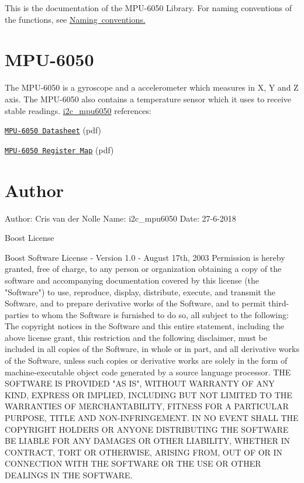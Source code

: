 This is the documentation of the M\+P\+U-\/6050 Library. For naming conventions of the functions, see \mbox{\hyperlink{_page1}{Naming conventions.}} \hypertarget{index_MPU-6050}{}\section{M\+P\+U-\/6050}\label{index_MPU-6050}
The M\+P\+U-\/6050 is a gyroscope and a accelerometer which measures in X, Y and Z axis. The M\+P\+U-\/6050 also contains a temperature sensor which it uses to receive stable readings. \mbox{\hyperlink{classi2c__mpu6050}{i2c\+\_\+mpu6050}}  references\+:
\begin{DoxyItemize}
\item \href{https://www.invensense.com/wp-content/uploads/2015/02/MPU-6000-Datasheet1.pdf}{\tt M\+P\+U-\/6050 Datasheet} (pdf)
\item \href{https://www.invensense.com/wp-content/uploads/2015/02/MPU-6000-Register-Map1.pdf}{\tt M\+P\+U-\/6050 Register Map} (pdf) 
\end{DoxyItemize}\hypertarget{index_Boost}{}\section{Author}\label{index_Boost}
\begin{DoxyVerb}Author: Cris van der Nolle
Name: i2c_mpu6050
Date: 27-6-2018
\end{DoxyVerb}
  Boost License \begin{DoxyVerb}Boost Software License - Version 1.0 - August 17th, 2003
Permission is hereby granted, free of charge, to any person or organization
obtaining a copy of the software and accompanying documentation covered by
this license (the "Software") to use, reproduce, display, distribute,
execute, and transmit the Software, and to prepare derivative works of the
Software, and to permit third-parties to whom the Software is furnished to
do so, all subject to the following:
The copyright notices in the Software and this entire statement, including
the above license grant, this restriction and the following disclaimer,
must be included in all copies of the Software, in whole or in part, and
all derivative works of the Software, unless such copies or derivative
works are solely in the form of machine-executable object code generated by
a source language processor.
THE SOFTWARE IS PROVIDED "AS IS", WITHOUT WARRANTY OF ANY KIND, EXPRESS OR
IMPLIED, INCLUDING BUT NOT LIMITED TO THE WARRANTIES OF MERCHANTABILITY,
FITNESS FOR A PARTICULAR PURPOSE, TITLE AND NON-INFRINGEMENT. IN NO EVENT
SHALL THE COPYRIGHT HOLDERS OR ANYONE DISTRIBUTING THE SOFTWARE BE LIABLE
FOR ANY DAMAGES OR OTHER LIABILITY, WHETHER IN CONTRACT, TORT OR OTHERWISE,
ARISING FROM, OUT OF OR IN CONNECTION WITH THE SOFTWARE OR THE USE OR OTHER
DEALINGS IN THE SOFTWARE.  \end{DoxyVerb}
 